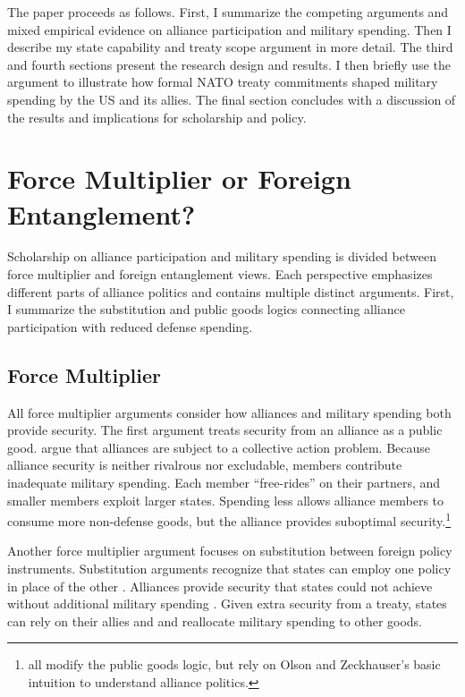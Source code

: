 \documentclass[12pt]{article}
\begin{document}
The paper proceeds as follows. 
First, I summarize the competing arguments and mixed empirical evidence on alliance participation and military spending. 
Then I describe my state capability and treaty scope argument in more detail. 
The third and fourth sections present the research design and results. 
I then briefly use the argument to illustrate how formal NATO treaty commitments shaped military spending by the US and its allies. 
The final section concludes with a discussion of the results and implications for scholarship and policy.  


\section{Force Multiplier or Foreign Entanglement?}


Scholarship on alliance participation and military spending is divided between force multiplier and foreign entanglement views.
Each perspective emphasizes different parts of alliance politics and contains multiple distinct arguments.  
First, I summarize the substitution and public goods logics connecting alliance participation with reduced defense spending. 


\subsection{Force Multiplier} 


All force multiplier arguments consider how alliances and military spending both provide security.
The first argument treats security from an alliance as a public good. 
\citet{OlsonZeckhauser1966} argue that alliances are subject to a collective action problem.
Because alliance security is neither rivalrous nor excludable, members contribute inadequate military spending. 
Each member ``free-rides'' on their partners, and smaller members exploit larger states. 
Spending less allows alliance members to consume more non-defense goods, but the alliance provides suboptimal security.\footnote{\citet{SandlerForbes1980, Oneal1990, SandlerHartley2001} all modify the public goods logic, but rely on Olson and Zeckhauser's basic intuition to understand alliance politics.} 


Another force multiplier argument focuses on substitution between foreign policy instruments.
Substitution arguments recognize that states can employ one policy in place of the other \citep{MostStarr1989}.  
Alliances provide security that states could not achieve without additional military spending \citep{Morrow1993, Conybeare1994}. 
Given extra security from a treaty, states can rely on their allies and and reallocate military spending to other goods. 
\end{document}
